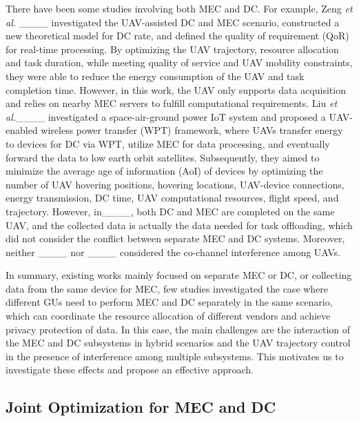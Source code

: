 \par There have been some studies involving both MEC and DC. For example, Zeng \textit{et al.} ____ investigated the UAV-assisted DC and MEC scenario, constructed a new theoretical model for DC rate, and defined the quality of requirement (QoR) for real-time processing. By optimizing the UAV trajectory, resource allocation and task duration, while meeting quality of service and UAV mobility constraints, they were able to reduce the energy consumption of the UAV and task completion time. However, in this work, the UAV only supports data acquisition and relies on nearby MEC servers to fulfill computational requirements. Liu \textit{et al.}____ investigated a space-air-ground power IoT system and proposed a UAV-enabled wireless power transfer (WPT) framework, where UAVs transfer energy to devices for DC via WPT, utilize MEC for data processing, and eventually forward the data to low earth orbit satellites. Subsequently, they aimed to minimize the average age of information (AoI) of devices by optimizing the number of UAV hovering positions, hovering locations, UAV-device connections, energy transmission, DC time, UAV computational resources, flight speed, and trajectory. However, in____, both DC and MEC are completed on the same UAV, and the collected data is actually the data needed for task offloading, which did not consider the conflict between separate MEC and DC systems. Moreover, neither ____ nor ____ considered the co-channel interference among UAVs.

\par In summary, existing works mainly focused on separate MEC or DC, or collecting data from the same device for MEC, few studies investigated the case where different GUs need to perform MEC and DC separately in the same scenario, which can coordinate the resource allocation of different vendors and achieve privacy protection of data. In this case, the main challenges are the interaction of the MEC and DC subsystems in hybrid scenarios and the UAV trajectory control in the presence of interference among multiple subsystems. This motivates us to investigate these effects and propose an effective approach.


\subsection{Joint Optimization for MEC and DC}

